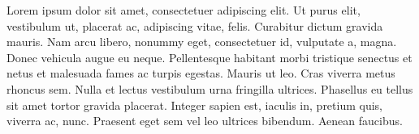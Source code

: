 {\rmfamily
Lorem ipsum dolor sit amet, consectetuer adipiscing elit. Ut purus elit,
vestibulum ut, placerat ac, adipiscing vitae, felis. Curabitur dictum gravida
mauris. Nam arcu libero, nonummy eget, consectetuer id, vulputate a, magna.
Donec vehicula augue eu neque. Pellentesque habitant morbi tristique senectus
et netus et malesuada fames ac turpis egestas. Mauris ut leo. Cras viverra
metus rhoncus sem. Nulla et lectus vestibulum urna fringilla ultrices.
Phasellus eu tellus sit amet tortor gravida placerat. Integer sapien est,
iaculis in, pretium quis, viverra ac, nunc. Praesent eget sem vel leo ultrices
bibendum. Aenean faucibus.}
